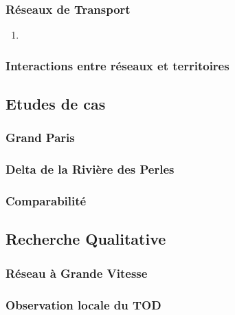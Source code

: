 \subsubsection{Réseaux de Transport}



\begin{enumerate}
	\item 
\end{enumerate}


\subsubsection{Interactions entre réseaux et territoires}




\subsection{Etudes de cas}


\subsubsection{Grand Paris}



\subsubsection{Delta de la Rivière des Perles}


\subsubsection{Comparabilité}





\subsection{Recherche Qualitative}

\subsubsection{Réseau à Grande Vitesse}

\subsubsection{Observation locale du TOD}

